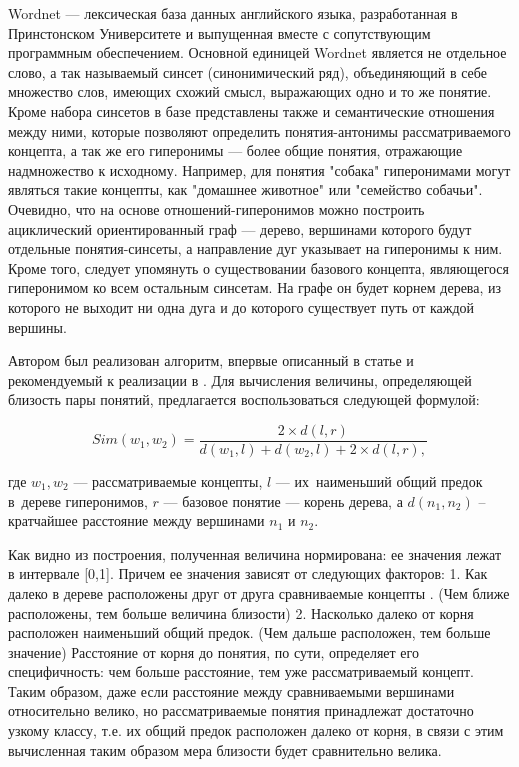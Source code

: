 Wordnet\cite{wordnet} --- лексическая база данных английского языка,
разработанная
в Принстонском Университете и выпущенная вместе с сопутствующим
программным обеспечением.
Основной единицей Wordnet является не отдельное слово, а так
называемый синсет (синонимический ряд),
объединяющий в себе множество слов, имеющих схожий смысл, выражающих
одно и то же понятие.
Кроме набора синсетов в базе представлены также и семантические
отношения между ними,
которые позволяют определить понятия-антонимы рассматриваемого концепта,
а так же его гиперонимы --- более общие понятия, отражающие надмножество
к исходному.
Например, для понятия "собака" гиперонимами могут являться такие концепты,
как "домашнее животное" или "семейство собачьи".
Очевидно, что на основе отношений-гиперонимов можно построить
ациклический ориентированный граф --- дерево, вершинами которого
будут отдельные понятия-синсеты, а направление дуг указывает на
гиперонимы к ним.
Кроме того, следует упомянуть о существовании базового концепта, являющегося
гиперонимом ко всем остальным синсетам. На графе он будет корнем дерева,
из которого не выходит ни одна дуга и до которого существует путь от
каждой вершины.

Автором был реализован алгоритм, впервые описанный  в статье
\cite{inproceedings}
и рекомендуемый к реализации в \cite{complexSim}.
Для вычисления величины, определяющей близость пары понятий, предлагается
воспользоваться следующей формулой:


$$ Sim(w_1, w_2) = \frac{ 2\times d(l, r) }
	               { d(w_1, l) + d(w_2, l) + 2\times d(l,r), }$$

где $w_1,w_2$ --- рассматриваемые концепты, 
$l$ --- их~наименьший общий предок в~дереве гиперонимов,
$r$ --- базовое понятие --- корень дерева, 
а $d(n_1,n_2)$ -- 
кратчайшее расстояние между вершинами $n_1$ и $n_2$.

Как видно из построения, полученная величина нормирована: ее значения лежат
в интервале [0,1].
Причем ее значения зависят от следующих факторов:
1. Как далеко в дереве расположены друг от друга сравниваемые концепты .
 (Чем ближе расположены, тем больше величина близости)
2. Насколько далеко от корня расположен наименьший общий предок.
  (Чем дальше расположен, тем больше значение)
Расстояние от корня до понятия, по сути, определяет его специфичность:
чем больше расстояние, тем уже рассматриваемый концепт.
Таким образом, даже если расстояние между сравниваемыми вершинами
относительно велико, но рассматриваемые понятия принадлежат
достаточно узкому классу, т.е. их общий предок расположен далеко от корня,
в связи с  этим вычисленная таким образом мера близости будет
сравнительно велика.

